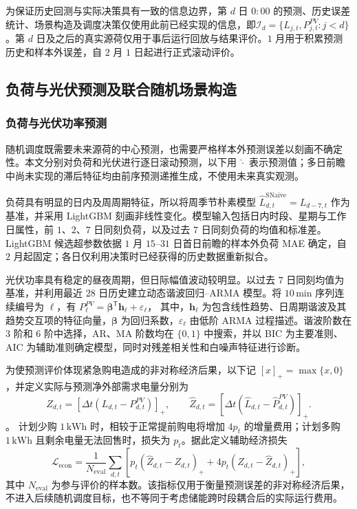 \documentclass[zihao=-4,a4paper,UTF8,fontset=none]{ctexart}
\begin{document}
为保证历史回测与实际决策具有一致的信息边界，第 $d$ 日 $0{:}00$ 的预测、历史误差统计、场景构造及调度决策仅使用此前已经实现的信息，即$\mathcal I_d=\{L_{j,t},P_{j,t}^{PV}:j<d\}$
。第 $d$ 日及之后的真实源荷仅用于事后运行回放与结果评价。$1$ 月用于积累预测历史和样本外误差，自 $2$ 月 $1$ 日起进行正式滚动评价。


\subsection{负荷与光伏预测及联合随机场景构造}

\subsubsection{负荷与光伏功率预测}

随机调度既需要未来源荷的中心预测，也需要严格样本外预测误差以刻画不确定性。本文分别对负荷和光伏进行逐日滚动预测，以下用 $\widehat{\cdot}$ 表示预测值；多日前瞻中尚未实现的滞后特征均由前序预测递推生成，不使用未来真实观测。

负荷具有明显的日内及周周期特征，所以将周季节朴素模型
$\widehat L_{d,t}^{\mathrm{SNaive}}=L_{d-7,t}$
作为基准，并采用 LightGBM 刻画非线性变化。模型输入包括日内时段、星期与工作日属性，前 $1$、$2$、$7$ 日同刻负荷，以及过去 $7$ 日同刻负荷的均值和标准差。LightGBM 候选超参数依据 $1$ 月 $15$--$31$ 日首日前瞻的样本外负荷 MAE 确定，自 $2$ 月起固定；各日仅利用决策时已经获得的历史数据重新拟合。

光伏功率具有稳定的昼夜周期，但日际幅值波动较明显。以过去 $7$ 日同刻均值为基准，并利用最近 $28$ 日历史建立动态谐波回归--ARMA 模型。将 $10\,\mathrm{min}$ 序列连续编号为 $\ell$，有
$P_{\ell}^{PV}=\boldsymbol{\beta}^{\mathsf T}\mathbf h_{\ell}+\varepsilon_{\ell}$，
其中，$\mathbf h_{\ell}$ 为包含线性趋势、日周期谐波及其趋势交互项的特征向量，$\boldsymbol{\beta}$ 为回归系数，$\varepsilon_{\ell}$ 由低阶 ARMA 过程描述。谐波阶数在 $3$ 阶和 $6$ 阶中选择，AR、MA 阶数均在 $\{0,1\}$ 中搜索，并以 BIC 为主要准则、AIC 为辅助准则确定模型，同时对残差相关性和白噪声特征进行诊断。

为使预测评价体现紧急购电造成的非对称经济后果，以下记
$[x]_+=\max\{x,0\}$，并定义实际与预测净外部需求电量分别为
\[
Z_{d,t}
=
\left[
\Delta t\left(L_{d,t}-P_{d,t}^{PV}\right)
\right]_+,
\qquad
\widehat Z_{d,t}
=
\left[
\Delta t\left(\widehat L_{d,t}-\widehat P_{d,t}^{PV}\right)
\right]_+.
\]。
计划少购 $1\,\mathrm{kWh}$ 时，相较于正常提前购电将增加 $4p_t$ 的增量费用；计划多购 $1\,\mathrm{kWh}$ 且剩余电量无法回售时，损失为 $p_t$。据此定义辅助经济损失
\begin{equation}
    \mathcal L_{\mathrm{econ}}
    =
    \frac{1}{N_{\mathrm{eval}}}
    \sum_{d,t}
    \left[
        p_t\left(\widehat Z_{d,t}-Z_{d,t}\right)_+
        +
        4p_t\left(Z_{d,t}-\widehat Z_{d,t}\right)_+
    \right],
    \label{eq:q2_economic_loss}
\end{equation}
其中 $N_{\mathrm{eval}}$ 为参与评价的样本数。该指标仅用于衡量预测误差的非对称经济后果，不进入后续随机调度目标，也不等同于考虑储能跨时段耦合后的实际运行费用。
\end{document}
